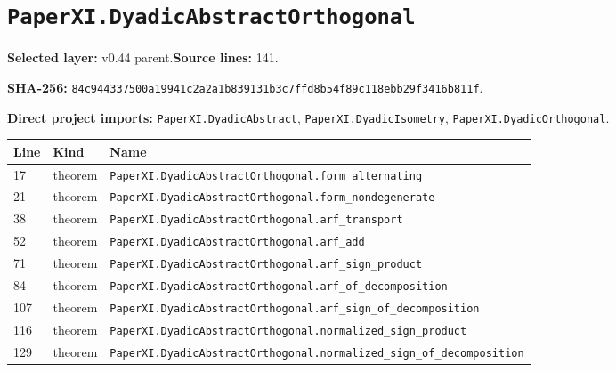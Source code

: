 \documentclass[10pt,oneside]{book}
\begin{document}
\section{\texorpdfstring{\nolinkurl{PaperXI.DyadicAbstractOrthogonal}}{PaperXI.DyadicAbstractOrthogonal}}\label{module:PaperXI.DyadicAbstractOrthogonal}

\textbf{Selected layer:} v0.44 parent.\quad\textbf{Source lines:} 141.\par\textbf{SHA-256:} {\scriptsize\nolinkurl{84c944337500a19941c2a2a1b839131b3c7ffd8b54f89c118ebb29f3416b811f}}.


\textbf{Direct project imports:} \nolinkurl{PaperXI.DyadicAbstract}, \nolinkurl{PaperXI.DyadicIsometry}, \nolinkurl{PaperXI.DyadicOrthogonal}.

\begin{longtable}{@{}p{}p{}p{}@{}}\toprule Line&Kind&Name\\\midrule\endhead

17&theorem&\nolinkurl{PaperXI.DyadicAbstractOrthogonal.form_alternating}\\

21&theorem&\nolinkurl{PaperXI.DyadicAbstractOrthogonal.form_nondegenerate}\\

38&theorem&\nolinkurl{PaperXI.DyadicAbstractOrthogonal.arf_transport}\\

52&theorem&\nolinkurl{PaperXI.DyadicAbstractOrthogonal.arf_add}\\

71&theorem&\nolinkurl{PaperXI.DyadicAbstractOrthogonal.arf_sign_product}\\

84&theorem&\nolinkurl{PaperXI.DyadicAbstractOrthogonal.arf_of_decomposition}\\

107&theorem&\nolinkurl{PaperXI.DyadicAbstractOrthogonal.arf_sign_of_decomposition}\\

116&theorem&\nolinkurl{PaperXI.DyadicAbstractOrthogonal.normalized_sign_product}\\

129&theorem&\nolinkurl{PaperXI.DyadicAbstractOrthogonal.normalized_sign_of_decomposition}\\

\bottomrule\end{longtable}
\end{document}
